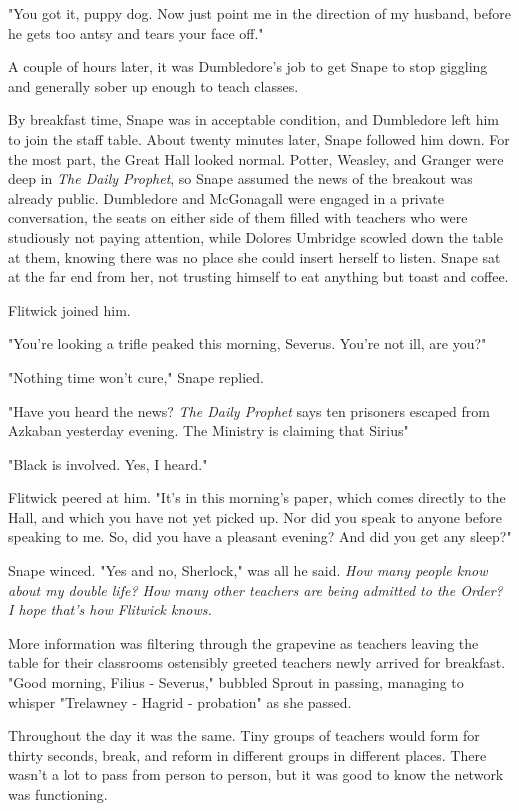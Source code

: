 "You got it, puppy dog. Now just point me in the direction of my husband, before he gets too antsy and tears your face off."

A couple of hours later, it was Dumbledore's job to get Snape to stop giggling and generally sober up enough to teach classes.

\sbreak

By breakfast time, Snape was in acceptable condition, and Dumbledore left him to join the staff table. About twenty minutes later, Snape followed him down. For the most part, the Great Hall looked normal. Potter, Weasley, and Granger were deep in \emph{The Daily Prophet}, so Snape assumed the news of the breakout was already public. Dumbledore and McGonagall were engaged in a private conversation, the seats on either side of them filled with teachers who were studiously not paying attention, while Dolores Umbridge scowled down the table at them, knowing there was no place she could insert herself to listen. Snape sat at the far end from her, not trusting himself to eat anything but toast and coffee.

Flitwick joined him.

"You're looking a trifle peaked this morning, Severus. You're not ill, are you?"

"Nothing time won't cure," Snape replied.

"Have you heard the news? \emph{The Daily Prophet} says ten prisoners escaped from Azkaban yesterday evening. The Ministry is claiming that Sirius{\el}"

"Black is involved. Yes, I heard."

Flitwick peered at him. "It's in this morning's paper, which comes directly to the Hall, and which you have not yet picked up. Nor did you speak to anyone before speaking to me. So, did you have a pleasant evening? And did you get any sleep?"

Snape winced. "Yes and no, Sherlock," was all he said. \emph{How many people know about my double life? How many other teachers are being admitted to the Order? I hope that's how Flitwick knows.}

More information was filtering through the grapevine as teachers leaving the table for their classrooms ostensibly greeted teachers newly arrived for breakfast. "Good morning, Filius - Severus," bubbled Sprout in passing, managing to whisper "Trelawney - Hagrid - probation" as she passed.

Throughout the day it was the same. Tiny groups of teachers would form for thirty seconds, break, and reform in different groups in different places. There wasn't a lot to pass from person to person, but it was good to know the network was functioning.

